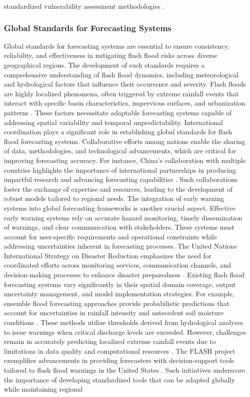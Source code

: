 standardized vulnerability assessment methodologies \citep{Kim2011}.

\subsubsection{Global Standards for Forecasting Systems}
Global standards for forecasting systems are essential to ensure consistency, reliability, and effectiveness in mitigating flash flood risks across diverse geographical regions. The development of such standards requires a comprehensive understanding of flash flood dynamics, including meteorological and hydrological factors that influence their occurrence and severity. Flash floods are highly localized phenomena, often triggered by extreme rainfall events that interact with specific basin characteristics, impervious surfaces, and urbanization patterns \citep{Saad2024}\citep{Yussouf2020}. These factors necessitate adaptable forecasting systems capable of addressing spatial variability and temporal unpredictability. International coordination plays a significant role in establishing global standards for flash flood forecasting systems. Collaborative efforts among nations enable the sharing of data, methodologies, and technological advancements, which are critical for improving forecasting accuracy. For instance, China's collaboration with multiple countries highlights the importance of international partnerships in producing impactful research and advancing forecasting capabilities \citep{Hinge2024}. Such collaborations foster the exchange of expertise and resources, leading to the development of robust models tailored to regional needs. The integration of early warning systems into global forecasting frameworks is another crucial aspect. Effective early warning systems rely on accurate hazard monitoring, timely dissemination of warnings, and clear communication with stakeholders. These systems must account for user-specific requirements and operational constraints while addressing uncertainties inherent in forecasting processes. The United Nations International Strategy on Disaster Reduction emphasizes the need for coordinated efforts across monitoring services, communication channels, and decision-making processes to enhance disaster preparedness \citep{Jubach2016}. Existing flash flood forecasting systems vary significantly in their spatial domain coverage, output uncertainty management, and model implementation strategies. For example, ensemble flood forecasting approaches provide probabilistic predictions that account for uncertainties in rainfall intensity and antecedent soil moisture conditions \citep{Luong2021}\citep{Naulin2013}. These methods utilize thresholds derived from hydrological analyses to issue warnings when critical discharge levels are exceeded. However, challenges remain in accurately predicting localized extreme rainfall events due to limitations in data quality and computational resources \citep{Hinge2024}. The FLASH project exemplifies advancements in providing forecasters with decision-support tools tailored to flash flood warnings in the United States \citep{Flamig2020}. Such initiatives underscore the importance of developing standardized tools that can be adapted globally while maintaining regional 